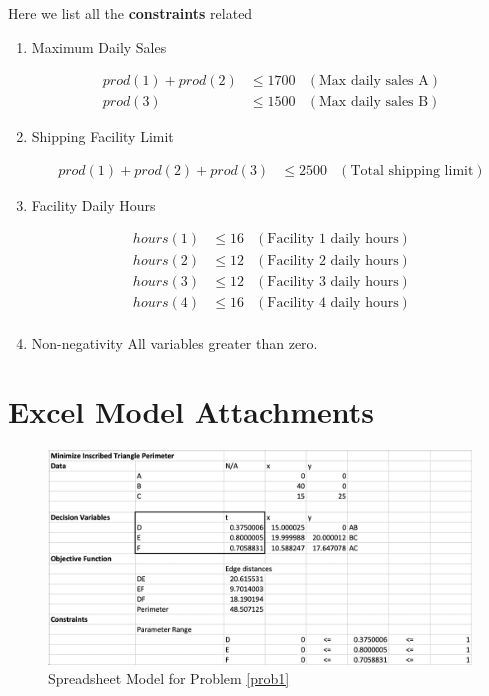 Here we list all the \textbf{constraints} related
\begin{enumerate}
    \item Maximum Daily Sales\par
    \begin{align*}
    prod(1) + prod(2) &\leq 1700 & (\text{Max daily sales A})\\
    prod(3) &\leq 1500 & (\text{Max daily sales B})
    \end{align*}
    \item Shipping Facility Limit \par
    \begin{align*}
    prod(1) + prod(2) + prod(3) &\leq 2500 &(\text{Total shipping limit}) 
    \end{align*}
    \item Facility Daily Hours \par
    \begin{align*}
    hours(1) &\leq 16 &(\text{Facility 1 daily hours}) \\
    hours(2) &\leq 12 &(\text{Facility 2 daily hours}) \\
    hours(3) &\leq 12 &(\text{Facility 3 daily hours}) \\
    hours(4) &\leq 16 &(\text{Facility 4 daily hours}) \\
    \end{align*}
    \item Non-negativity
    All variables greater than zero.
    
\end{enumerate}

\pagebreak

\section{Excel Model Attachments}

\begin{figure}[h]
    \centering
    \includegraphics[width=\textwidth]{hw1/hw1-prob1.png}
    \caption{Spreadsheet Model for Problem \ref{prob1}}
    \label{fig:my_label}
\end{figure}

